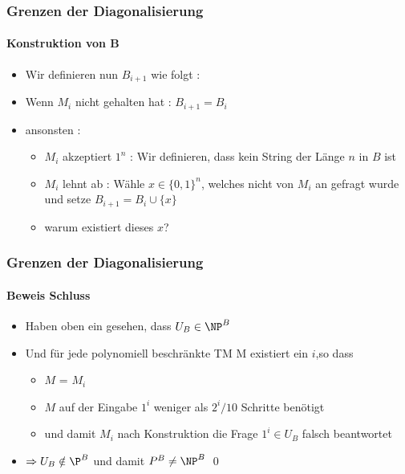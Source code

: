\begin{frame}
	\frametitle{Grenzen der Diagonalisierung}
	\framesubtitle{Konstruktion von B}
	\begin{itemize}[<+->]
	  \item Wir definieren nun $B_{i+1}$ wie folgt :
	  \item Wenn $M_i$ nicht gehalten hat : $B_{i+1} = B_i$
	  \item ansonsten : \begin{itemize}
	    \item $M_i$ akzeptiert $1^n$ : Wir definieren, dass kein String der Länge $n$
	    in $B$ ist
	    \item $M_i$ lehnt ab : Wähle $x \in {\lbrace 0,1 \rbrace}^n$, welches nicht
	    von $M_i$ an gefragt wurde und setze $B_{i+1} = B_i \cup \lbrace x \rbrace$
	    \item warum existiert dieses $x$?
	    \end{itemize}
	\end{itemize}
\end{frame}

\begin{frame}
	\frametitle{Grenzen der Diagonalisierung}
	\framesubtitle{Beweis Schluss}
	
	\begin{itemize}[<+->]
	  \item Haben oben ein gesehen, dass $U_B \in {\NP}^B$
	  \item Und f\"ur jede polynomiell beschränkte TM M existiert ein $i$,so dass 
	  	\begin{itemize}
	  	  \item $M$ = $M_i$
	  	  \item $M$ auf der Eingabe $1^i$ weniger als $2^i / 10 $ Schritte benötigt
	  	  \item und damit $M_i$ nach Konstruktion die Frage $1^i \in U_B$ falsch
	  	  beantwortet
	  	 \end{itemize}
	  	\item $\Rightarrow U_B \notin {\P}^B$ und damit ${P}^B \neq {\NP}^B$ \qed
	\end{itemize}
\end{frame}